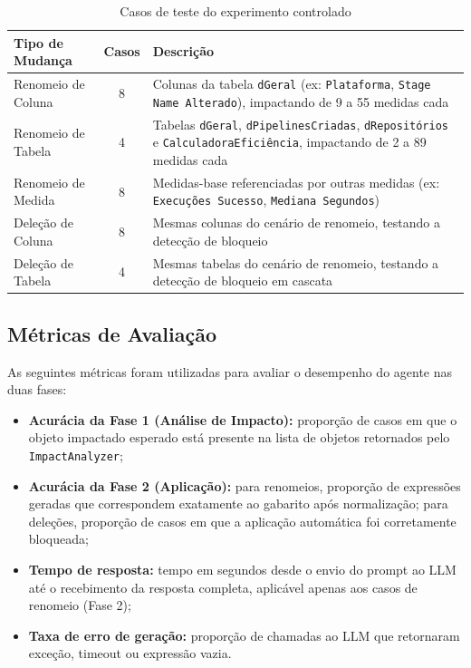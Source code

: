\documentclass[
    12pt,               %
    openright,          %
    oneside,            %
    a4paper,            %
    chapter=TITLE,      %
    section=TITLE,      %
    brazil              %
]{abntex2}
\begin{document}
\begin{table}[H]
    \centering
    \caption{Casos de teste do experimento controlado}
    \label{tab:casos-teste}
    \begin{tabularx}{\textwidth}{lcX}
        \toprule
        \textbf{Tipo de Mudança} & \textbf{Casos} & \textbf{Descrição} \\
        \midrule
        Renomeio de Coluna  & 8 & Colunas da tabela \texttt{dGeral} (ex: \texttt{Plataforma}, \texttt{Stage Name Alterado}), impactando de 9 a 55 medidas cada \\
        Renomeio de Tabela  & 4 & Tabelas \texttt{dGeral}, \texttt{dPipelinesCriadas}, \texttt{dRepositórios} e \texttt{CalculadoraEficiência}, impactando de 2 a 89 medidas cada \\
        Renomeio de Medida  & 8 & Medidas-base referenciadas por outras medidas (ex: \texttt{Execuções Sucesso}, \texttt{Mediana Segundos}) \\
        Deleção de Coluna   & 8 & Mesmas colunas do cenário de renomeio, testando a detecção de bloqueio \\
        Deleção de Tabela   & 4 & Mesmas tabelas do cenário de renomeio, testando a detecção de bloqueio em cascata \\
        \bottomrule
    \end{tabularx}
\end{table}

\subsection{Métricas de Avaliação}

As seguintes métricas foram utilizadas para avaliar o desempenho do agente nas duas fases:

\begin{itemize}
    \item \textbf{Acurácia da Fase 1 (Análise de Impacto):} proporção de casos em que o objeto impactado esperado está presente na lista de objetos retornados pelo \texttt{ImpactAnalyzer};
    \item \textbf{Acurácia da Fase 2 (Aplicação):} para renomeios, proporção de expressões geradas que correspondem exatamente ao gabarito após normalização; para deleções, proporção de casos em que a aplicação automática foi corretamente bloqueada;
    \item \textbf{Tempo de resposta:} tempo em segundos desde o envio do prompt ao LLM até o recebimento da resposta completa, aplicável apenas aos casos de renomeio (Fase 2);
    \item \textbf{Taxa de erro de geração:} proporção de chamadas ao LLM que retornaram exceção, timeout ou expressão vazia.
\end{itemize}
\end{document}
